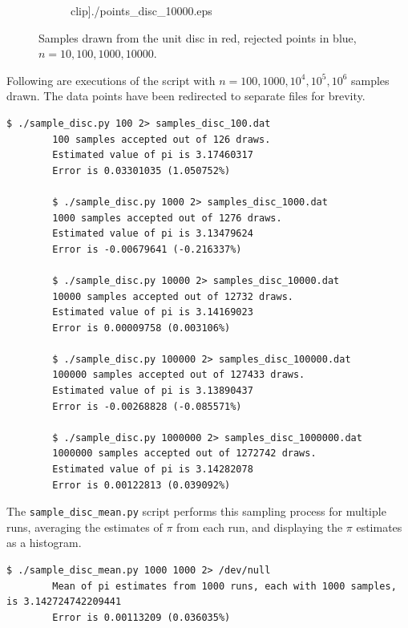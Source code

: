 \documentclass[10pt]{article}
\begin{document}
\begin{figure}[H]
\begin{subfigure}{0.45\textwidth}
        clip]{./points_disc_10000.eps}
    \end{subfigure}
    \caption{Samples drawn from the unit disc in red, rejected points in blue, $n =
    10, 100, 1000, 10000$.}
    \end{figure}

    Following are executions of the script with $n = 100, 1000, 10^4, 10^5, 10^6$
    samples drawn. The data points have been redirected to separate files for
    brevity.

    \begin{lstlisting}[numbers=none, basicstyle=\ttfamily]
        $ ./sample_disc.py 100 2> samples_disc_100.dat
        100 samples accepted out of 126 draws.
        Estimated value of pi is 3.17460317
        Error is 0.03301035 (1.050752%)
        
        $ ./sample_disc.py 1000 2> samples_disc_1000.dat
        1000 samples accepted out of 1276 draws.
        Estimated value of pi is 3.13479624
        Error is -0.00679641 (-0.216337%)

        $ ./sample_disc.py 10000 2> samples_disc_10000.dat
        10000 samples accepted out of 12732 draws.
        Estimated value of pi is 3.14169023
        Error is 0.00009758 (0.003106%)
        
        $ ./sample_disc.py 100000 2> samples_disc_100000.dat
        100000 samples accepted out of 127433 draws.
        Estimated value of pi is 3.13890437
        Error is -0.00268828 (-0.085571%)

        $ ./sample_disc.py 1000000 2> samples_disc_1000000.dat
        1000000 samples accepted out of 1272742 draws.
        Estimated value of pi is 3.14282078
        Error is 0.00122813 (0.039092%)
    \end{lstlisting}
    

    The \texttt{sample\_disc\_mean.py} script performs this sampling process for
    multiple runs, averaging the estimates of $\pi$ from each run, and displaying the
    $\pi$ estimates as a histogram.

    \begin{lstlisting}[numbers=none, basicstyle=\ttfamily]
        $ ./sample_disc_mean.py 1000 1000 2> /dev/null
        Mean of pi estimates from 1000 runs, each with 1000 samples, is 3.142724742209441
        Error is 0.00113209 (0.036035%)
    \end{lstlisting}
\end{document}
